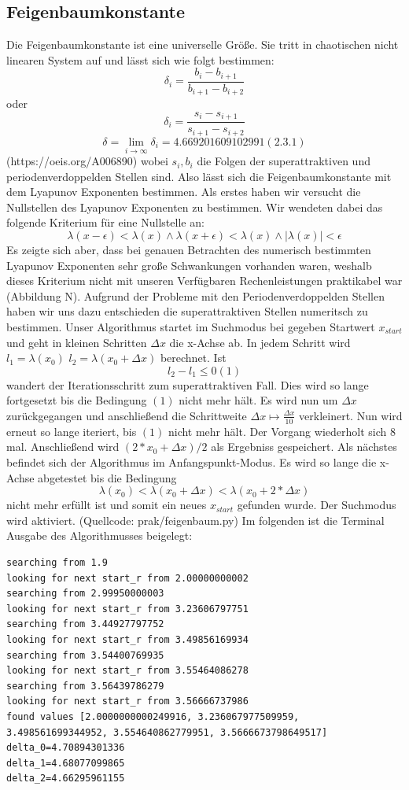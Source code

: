 \documentclass{scrartcl}
\begin{document}
\subsection{Feigenbaumkonstante}
Die Feigenbaumkonstante ist eine universelle Größe. Sie tritt in chaotischen nicht linearen System auf und lässt sich wie folgt bestimmen:
$$\delta_i = \frac{b_i-b_{i+1}}{b_{i+1}-b_{i+2}}$$ oder $$\delta_i = \frac{s_i-s_{i+1}}{s_{i+1}-s_{i+2}}$$
$$\delta = \lim\limits_{i \rightarrow \infty}{\delta_i} = 4.669201609102991 (2.3.1) $$ (https://oeis.org/A006890)
wobei $s_i, b_i$ die Folgen der superattraktiven und periodenverdoppelden Stellen sind.
Also lässt sich die Feigenbaumkonstante mit dem Lyapunov Exponenten bestimmen. 
Als erstes haben wir versucht die Nullstellen des Lyapunov Exponenten zu bestimmen. Wir wendeten dabei das folgende Kriterium für eine Nullstelle an:
$$\lambda(x-\epsilon) < \lambda(x) \wedge \lambda(x+\epsilon) < \lambda(x) \wedge |\lambda(x)|<\epsilon$$
Es zeigte sich aber, dass bei genauen Betrachten des numerisch bestimmten Lyapunov Exponenten sehr große Schwankungen vorhanden waren, weshalb dieses Kriterium nicht mit unseren Verfügbaren Rechenleistungen praktikabel war (Abbildung N).
Aufgrund der Probleme mit den Periodenverdoppelden Stellen 
haben wir uns dazu entschieden die superattraktiven Stellen numeritsch zu bestimmen. Unser Algorithmus startet im Suchmodus bei gegeben Startwert $x_{start}$ und geht in kleinen Schritten $\Delta x$ die x-Achse ab. In jedem Schritt wird $l_1=\lambda(x_0)$ $l_2=\lambda(x_0 + \Delta x)$ berechnet. 
Ist
$$l_2-l_1 \leq 0 (1) $$
wandert der Iterationsschritt zum superattraktiven Fall. 
Dies wird so lange fortgesetzt bis die Bedingung $(1)$ nicht mehr hält. 
Es wird nun um $\Delta x$ zurückgegangen und anschließend die Schrittweite $\Delta x \mapsto \frac{\Delta x}{10} $ verkleinert. Nun wird erneut so lange iteriert, bis $(1)$ nicht mehr hält. 
Der Vorgang wiederholt sich 8 mal. Anschließend wird $(2*x_0 + \Delta x )/2$ als Ergebniss gespeichert. 
Als nächstes befindet sich der Algorithmus im Anfangspunkt-Modus. Es wird so lange die x-Achse abgetestet bis die Bedingung 
$$\lambda(x_0) < \lambda(x_0 + \Delta x) < \lambda(x_0 + 2*\Delta x)$$
nicht mehr erfüllt ist und somit ein neues $x_{start}$ gefunden wurde. Der Suchmodus wird aktiviert.  (Quellcode: prak/feigenbaum.py)
Im folgenden ist die Terminal Ausgabe des Algorithmusses beigelegt:
\begin{lstlisting}
searching from 1.9
looking for next start_r from 2.00000000002
searching from 2.99950000003
looking for next start_r from 3.23606797751
searching from 3.44927797752
looking for next start_r from 3.49856169934
searching from 3.54400769935
looking for next start_r from 3.55464086278
searching from 3.56439786279
looking for next start_r from 3.56666737986
found values [2.0000000000249916, 3.236067977509959, 3.498561699344952, 3.554640862779951, 3.5666673798649517]
delta_0=4.70894301336
delta_1=4.68077099865
delta_2=4.66295961155
\end{lstlisting}
\end{document}
